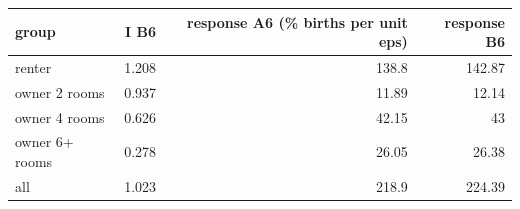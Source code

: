 \begin{tabular}{lrrr}
\toprule
group & I B6 & response A6 (\% births per unit eps) & response B6 \\
\midrule
renter & 1.208 & 138.8 & 142.87 \\
owner 2 rooms & 0.937 & 11.89 & 12.14 \\
owner 4 rooms & 0.626 & 42.15 & 43 \\
owner 6+ rooms & 0.278 & 26.05 & 26.38 \\
all & 1.023 & 218.9 & 224.39 \\
\bottomrule
\end{tabular}
